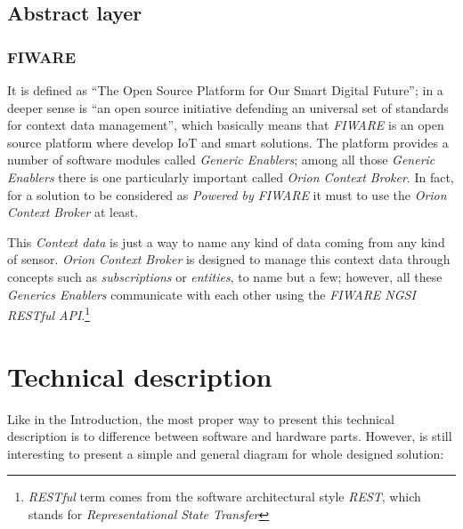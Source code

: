 \documentclass[11pt,a4paper,dvipsnames,twoside]{article}
\begin{document}
\subsection{Abstract layer}

\subsubsection{FIWARE}
It is defined as \enquote{The Open Source Platform for Our Smart Digital Future}\cite{Fiware}; in a deeper sense is \enquote{an open source initiative defending an universal set of standards for context data management}\cite{Fiware}, which basically means that \textit{FIWARE} is an open source platform where develop IoT and smart solutions. The platform provides a number of software modules called \textit{Generic Enablers}; among all those \textit{Generic Enablers} there is one particularly important called \textit{Orion Context Broker}. In fact, for a solution to be considered as \textit{Powered by FIWARE} it must to use the \textit{Orion Context Broker} at least. 

This \textit{Context data} is just a way to name any kind of data coming from any kind of sensor. \textit{Orion Context Broker} is designed to manage this context data through concepts such as \textit{subscriptions} or \textit{entities}, to name but a few; however, all these \textit{Generics Enablers} communicate with each other using the \textit{FIWARE NGSI RESTful API}\cite{NGSI}.\footnote{\textit{RESTful} term comes from the software architectural style \textit{REST}, which stands for \textit{Representational State Transfer}}

\newpage
\section{Technical description}
Like in the Introduction, the most proper way to present this technical description is to difference between software and hardware parts. However, is still interesting to present a simple and general diagram for whole designed solution:
\end{document}
